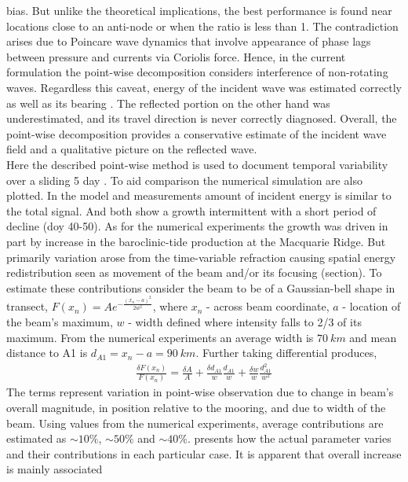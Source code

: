 \documentclass[12pt]{article}
\begin{document}
bias. But unlike the theoretical implications, the best performance is found near locations close to 
an anti-node or when the ratio is less than 1. The contradiction arises due to Poincare wave 
dynamics that involve appearance of phase lags between pressure and currents via Coriolis force. 
Hence, in the current formulation the point-wise decomposition considers interference of 
non-rotating waves. Regardless this caveat, energy of the incident wave was estimated 
correctly as well as its bearing . The reflected portion on the 
other hand was underestimated, and its travel direction is never correctly diagnosed. Overall, the 
point-wise decomposition provides a conservative estimate of the incident wave field and a 
qualitative picture on the reflected wave.\\
Here the described point-wise method is used to document temporal variability over a sliding 5 day . To aid comparison the numerical simulation are also plotted. In the model and measurements amount of incident energy is similar to the total signal. And both show a growth intermittent with a short period of decline (doy 40-50). As for the numerical experiments the growth was driven in part by increase in the baroclinic-tide production at the Macquarie Ridge. But primarily variation arose from the time-variable refraction causing spatial energy redistribution seen as movement of the beam and/or its focusing (section). To estimate these contributions consider the beam to be of a Gaussian-bell shape in transect, $F(x_n) = A e^{-\frac{(x_n - a)^2}{2w^2}}$, where $x_n$ - 
across beam coordinate, $a$ - location of the beam's maximum, $w$ - width defined where intensity 
falls to 2/3 of its maximum. From the numerical experiments an average width is $70~km$ and mean 
distance to A1 is $d_{A1} = x_n - a = 90~km$. Further taking differential produces,
\begin{align}
\frac{\delta F(x_n)}{F(x_n)} = \frac{\delta A}{A} + \frac{\delta d_{A1}}{w} \frac{d_{A1}}{w} + 
\frac{\delta w}{w} \frac{d_{A1}^2}{w^2}
\end{align}
The terms represent variation in point-wise observation due to change in beam's overall magnitude, 
in position relative to the mooring, and due to width of the beam. Using values from the numerical 
experiments, average contributions are estimated as $\sim 10\%$, $\sim 50\%$ and $\sim 40\%$.  presents how the actual parameter varies and their 
contributions in each particular case. It is apparent that overall increase is mainly associated 
\end{document}
